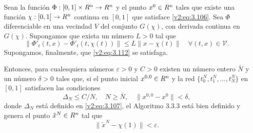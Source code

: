 \begin{theorem}\label{v2:thm:3.3.4}
    Sean la función $\Phi : [0, 1] \times R^n \to R^n$ y el punto $x^0 \in R^n$ tales que existe una función $\chi : [0, 1] \to R^n$ continua en $[0, 1]$ que satisface \eqref{v2:eq:3.106}. Sea $\Phi$ diferenciable en una vecindad $V$ del conjunto $G(\chi)$, con derivada continua en $G(\chi)$. Supongamos que exista un número $L > 0$ tal que
    \begin{equation}
        \|\Phi'_t(t, x) - \Phi'_t(t, \chi(t))\| \le L \|x - \chi(t)\| \quad \forall (t, x) \in \mathcal{V}.
        \label{v2:eq:3.121}
    \end{equation}
    Supongamos, finalmente, que \eqref{v2:eq:3.112} se satisfaga.
    
    Entonces, para cualesquiera números $\varepsilon > 0$ y $C > 0$ existen un número entero $\bar{N}$ y un número $\delta > 0$ tales que, si el punto inicial $x^{0,0} \in R^n$ y la red $\{t_0^N, t_1^N, \dots, t_N^N\}$ en $[0, 1]$ satisfacen las condiciones
    \begin{equation}
        \Delta_N \le C / N, \quad N \ge \bar{N}, \quad \|x^{0,0} - x^0\| < \delta,
        \label{v2:eq:3.122}
    \end{equation}
    donde $\Delta_N$ está definido en \eqref{v2:eq:3.107}, el Algoritmo 3.3.3 está bien definido y genera el punto $\tilde{x}^N \in R^n$ tal que
    \[
        \|\tilde{x}^N - \chi(1)\| < \varepsilon.
    \]
\end{theorem}

